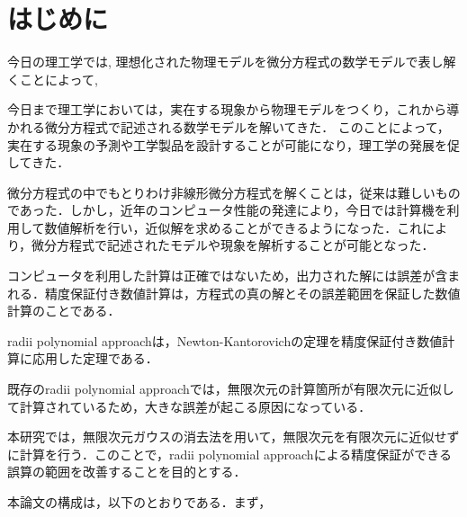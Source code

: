 \chapter{はじめに}
今日の理工学では, 理想化された物理モデルを微分方程式の数学モデルで表し解くことによって,

今日まで理工学においては，実在する現象から物理モデルをつくり，これから導かれる微分方程式で記述される数学モデルを解いてきた．
このことによって，実在する現象の予測や工学製品を設計することが可能になり，理工学の発展を促してきた．\cite{}

微分方程式の中でもとりわけ非線形微分方程式を解くことは，従来は難しいものであった．しかし，近年のコンピュータ性能の発達により，今日では計算機を利用して数値解析を行い，近似解を求めることができるようになった．これにより，微分方程式で記述されたモデルや現象を解析することが可能となった．

コンピュータを利用した計算は正確ではないため，出力された解には誤差が含まれる．精度保証付き数値計算は，方程式の真の解とその誤差範囲を保証した数値計算のことである．

radii polynomial approachは，Newton-Kantorovichの定理を精度保証付き数値計算に応用した定理である．

既存のradii polynomial approachでは，無限次元の計算箇所が有限次元に近似して計算されているため，大きな誤差が起こる原因になっている．

本研究では，無限次元ガウスの消去法を用いて，無限次元を有限次元に近似せずに計算を行う．このことで，radii polynomial approachによる精度保証ができる誤算の範囲を改善することを目的とする．

本論文の構成は，以下のとおりである．まず，
